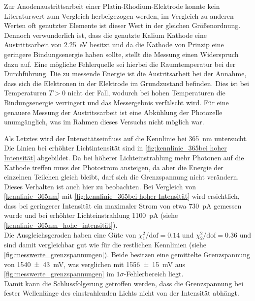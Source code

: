 Zur Anodenaustrittsarbeit einer Platin-Rhodium-Elektrode
konnte kein Literaturwert zum Vergleich herbeigezogen werden, im Vergleich
zu anderen Werten oft genutzter Elemente\cite{wiki:austrittsarbeit} ist dieser Wert in der
gleichen Größenordnung. Dennoch verwunderlich ist, dass die genutzte Kalium
Kathode eine Austrittsarbeit von \SI{2.25}{\electronvolt}\cite{wiki:austrittsarbeit}
besitzt und da die Kathode von Prinzip eine geringere Bindungsenergie
haben sollte, stellt die Messung einen Widerspruch dazu auf. Eine mögliche
Fehlerquelle sei hierbei die Raumtemperatur bei der Durchführung.
Die zu messende Energie ist die Austritsarbeit bei der Annahme, dass sich 
die Elektronen in der Elektrode im Grundzustand befinden. Dies ist 
bei Temperaturen $T>0$ nicht der Fall, wodurch bei hohen Temperaturen
die Bindungsenergie verringert und das Messergebnis verfälscht wird. 
Für eine genauere Messung der Austritssarbeit ist eine Abkühlung 
der Photozelle unumgänglich, was im Rahmen dieses Versuchs nicht möglich war.\\\par



Als Letztes wird der Intensitätseinfluss auf die Kennlinie bei \SI{365}{\nano\meter}
untersucht. Die Linien bei erhöhter Lichtintensität sind in \cref{fig:kennlinie_365bei hoher Intensität}
abgebildet. Da bei höherer Lichteinstrahlung mehr Photonen
auf die Kathode treffen muss der Photostrom ansteigen, da
aber die Energie der einzelnen Teilchen gleich bleibt, darf sich
die Grenzspannung nicht verändern.\\
Dieses Verhalten ist auch hier zu beobachten. Bei Vergleich von \cref{kennlinie_365nm} mit
\cref{fig:kennlinie_365bei hoher Intensität} wird ersichtlich, dass
bei geringerer Intensität ein maximaler Strom von etwa \SI{730}{\pico\ampere} gemessen
wurde und bei erhöhter Lichteinstrahlung \SI{1100}{\pico\ampere} (siehe
\cref{kennlinie_365nm_hohe_intensität}).\\

Die Ausgleichsgeraden haben eine Güte von $\chi^2_1/\mathrm{dof} = \num{0.14}$ und
$\chi^2_2/\mathrm{dof} = \num{0.36}$ und sind damit vergleichbar gut wie für die restlichen
Kennlinien (siehe \cref{fig:messwerte_grenzspannungen}). Beide besitzen eine gemittelte
Grenzspannung von \SI{1540\pm43}{\milli\volt}, was verglichen mit \SI{1556\pm 15}{\milli\volt}
aus \cref{fig:messwerte_grenzspannungen} im $1\sigma$-Fehlerbereich liegt. \\
Damit kann die Schlussfolgerung getroffen werden, dass die Grenzspannung
bei fester Wellenlänge des einstrahlenden Lichts nicht von der Intensität abhängt.
